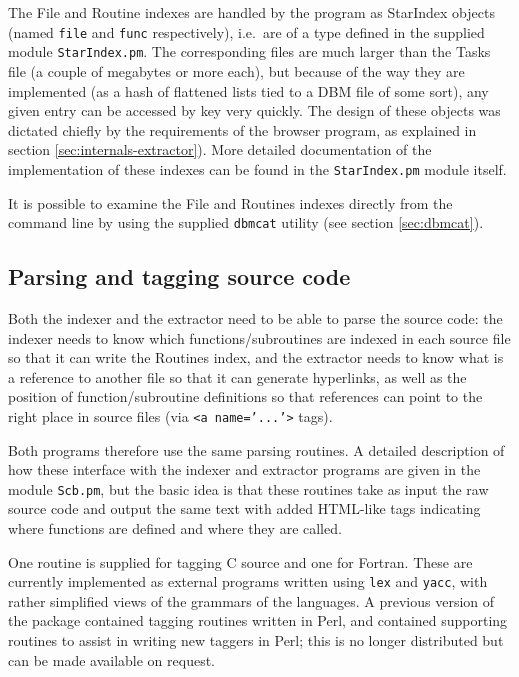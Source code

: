\documentclass[twoside,11pt]{article}
\newcommand{\xlabel}[1]{}
\renewcommand{\_}{\texttt{\symbol{95}}}
\begin{document}
The File and Routine indexes are
handled by the program as StarIndex 
objects (named {\tt file} and {\tt func} respectively), 
i.e.\ are of a type 
defined in the supplied module {\tt StarIndex.pm}.
The corresponding files are much larger than the Tasks file 
(a couple of megabytes or more each),
but because of the way they are implemented 
(as a hash of flattened lists tied to a DBM file of some sort), 
any given entry can be accessed by key very quickly.
The design of these objects was dictated chiefly by the requirements
of the browser program, as explained in 
section \ref{sec:internals-extractor}).
More detailed documentation of the implementation of these indexes
can be found in the {\tt StarIndex.pm} module itself.

It is possible to examine the File and Routines indexes 
directly from the command line by using the supplied {\tt dbmcat}
utility (see section \ref{sec:dbmcat}).



\subsection{\xlabel{sec:internals-tagging}\label{sec:internals-tagging}Parsing and tagging source code}

Both the indexer and the extractor need to be able to parse the 
source code: the indexer needs to know which
functions/subroutines are indexed in each source file so that
it can write the Routines index, and the extractor needs to know
what is a reference to another file so that it can generate
hyperlinks, as well as the position of function/subroutine 
definitions so that references can point to the right place in
source files (via {\tt <a~name='...'>} tags).

Both programs therefore use the same parsing routines. 
A detailed description of how these interface with
the indexer and extractor programs are given in the 
module {\tt Scb.pm}, but the basic idea is that these routines
take as input the raw source code and output the same text
with added HTML-like tags indicating where functions are defined 
and where they are called.

One routine is supplied for tagging C source and one for Fortran.  
These are currently implemented as external programs 
written using {\tt lex} and {\tt yacc}, with rather simplified 
views of the grammars of the languages.
A previous version of the package contained tagging routines written
in Perl, and contained supporting routines to assist in writing new 
taggers in Perl; this is no longer distributed but can
be made available on request.
\end{document}
